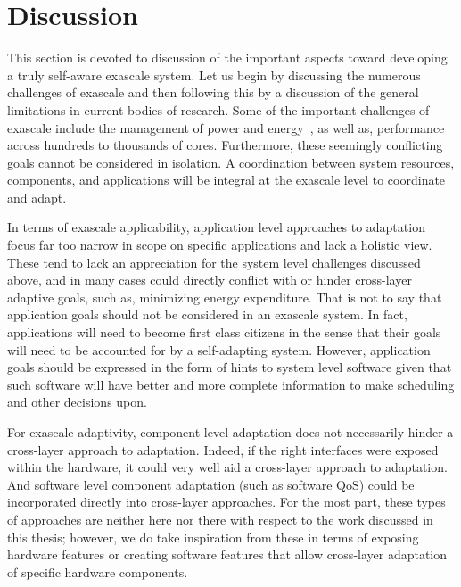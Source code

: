 \section{Discussion}
    \label{sec:related_work_discussion}
    This section is devoted to discussion of the important aspects toward developing a truly self-aware exascale system. Let us begin by discussing the numerous challenges of exascale and then following this by a discussion of the general limitations in current bodies of research. Some of the important challenges of exascale include the management of power and energy~\cite{Dally2011}, as well as, performance across hundreds to thousands of cores. Furthermore, these seemingly conflicting goals cannot be considered in isolation. A coordination between system resources, components, and applications will be integral at the exascale level to coordinate and adapt.

    In terms of exascale applicability, application level approaches to adaptation focus far too narrow in scope on specific applications and lack a holistic view. These tend to lack an appreciation for the system level challenges discussed above, and in many cases could directly conflict with or hinder cross-layer adaptive goals, such as, minimizing energy expenditure. That is not to say that application goals should not be considered in an exascale system. In fact, applications will need to become first class citizens in the sense that their goals will need to be accounted for by a self-adapting system. However, application goals should be expressed in the form of hints to system level software given that such software will have better and more complete information to make scheduling and other decisions upon.
    
    For exascale adaptivity, component level adaptation does not necessarily hinder a cross-layer approach to adaptation. Indeed, if the right interfaces were exposed within the hardware, it could very well aid a cross-layer approach to adaptation. And software level component adaptation (such as software QoS) could be incorporated directly into cross-layer approaches. For the most part, these types of approaches are neither here nor there with respect to the work discussed in this thesis; however, we do take inspiration from these in terms of exposing hardware features or creating software features that allow cross-layer adaptation of specific hardware components.
    
